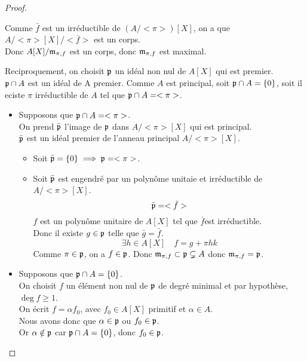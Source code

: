 \begin{proof}
\begin{itemize}
		      Comme $\bar{f}$ est un irréductible de $(A/<\pi>)[X]$, on a que $A/<\pi>[X]/<\bar{f}>$ est un corps.\\
		      Donc $A[X]/\mathfrak{m}_{\pi,f}$ est un corps, donc $\mathfrak{m}_{\pi,f}$ est maximal.
	\end{itemize}
	\vspace{0.25cm}
	\noindent Reciproquement, on choisit $\mathfrak{p}$ un idéal non nul de $A[X]$ qui est premier. \\
	$\mathfrak{p} \cap A$ est un idéal de A premier.
	Comme $A$ est principal, soit $\mathfrak{p} \cap A = \{0\}$, soit il eciste $\pi$ irréductible de $A$ tel que $\mathfrak{p} \cap A = <\pi>$.
	\begin{itemize}
		\item Supposons que $\mathfrak{p} \cap A = <\pi>$.\\
		      On prend $\bar{\mathfrak{p}}$ l'image de $\mathfrak{p}$ dans $A/<\pi>[X]$ qui est principal.\\
		      $\bar{\mathfrak{p}}$ est un idéal premier de l'anneau principal $A/<\pi>[X]$.\\
		      \begin{itemize}
			      \item Soit $\bar{\mathfrak{p}} = \{0\} \implies \mathfrak{p} = <\pi>$.
			      \item Soit $\bar{\mathfrak{p}}$ est engendré par un polynôme unitaie et irréductible de $A/<\pi>[X]$.
			            $$ \bar{\mathfrak{p}} = <\bar{f}> $$
			            $f$ est un polynôme unitaire de $A[X]$ tel que $\bar{f}$est irréductible. \\
			            Donc il existe $g \in \mathfrak{p}$ telle que $\bar{g} = \bar{f}$.
			            $$ \exists h \in A[X] \quad f = g + \pi h k$$
			            Comme $\pi \in \mathfrak{p}$, on a $f \in \mathfrak{p}$.
			            Donc $\mathfrak{m}_{\pi,f} \subset \mathfrak{p} \subsetneq A$
			            donc $\mathfrak{m}_{\pi,f} = \mathfrak{p}$.
		      \end{itemize}
		\item Supposons que $\mathfrak{p} \cap A = \{0\}$.\\
		      On choisit $f$ un élément non nul de $\mathfrak{p}$ de degré minimal et par hypothèse, $\deg f \geq 1$.\\
		      On écrit $f = \alpha f_0$, avec $f_0 \in A[X]$ primitif et $\alpha \in A$.\\
		      Nous avons donc que $\alpha \in \mathfrak{p}$ ou $f_0 \in \mathfrak{p}$. \\
		      Or $\alpha \notin \mathfrak{p}$ car $\mathfrak{p} \cap A = \{0\}$, donc $f_0 \in \mathfrak{p}$.\\

\end{itemize}
\end{proof}

